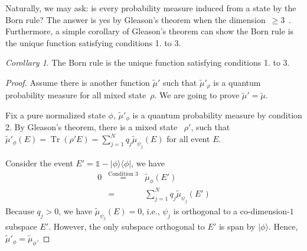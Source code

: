 \documentclass{article}
\theoremstyle{remark}
\newtheorem{cor}{Corollary}
\newcommand{\Hilb}{\mathcal{H}}
\newcommand{\ket}[1]{|#1\rangle}
\newcommand{\proj}[1]{|#1 \rangle\langle #1 |}
\newcommand{\Tr}{\mathop{\mathrm{Tr}}\nolimits}
\begin{document}
Naturally, we may ask: is every probability measure induced from a
state by the Born rule? The answer is yes by Gleason's theorem when
the dimension~$\ge3$~\cite{gleason1957,peres1995quantum,Redhead1987-REDINA}.
Furthermore, a simple corollary of Gleason's theorem can show the
Born rule is the unique function satisfying conditions 1. to 3.
\begin{cor}
The Born rule is the unique function satisfying conditions 1. to 3.
\end{cor}
\begin{proof}
Assume there is another function $\tilde{\mu}'$ such that $\tilde{\mu}'_{\rho}$
is a quantum probability measure for all mixed state~$\rho$. We
are going to prove $\tilde{\mu}'=\tilde{\mu}$.

Fix a pure normalized state $\phi$, $\tilde{\mu}'_{\phi}$ is a quantum
probability measure by condition 2. By Gleason's theorem, there is
a mixed state ~$\rho'$, such that $\tilde{\mu}'_{\phi}\left(E\right)=\Tr\left(\rho'E\right)=\sum_{j=1}^{N}q_{j}\tilde{\mu}_{\psi_{j}}\left(E\right)$
for all event $E$. 

Consider the event $E'=\mathbb{1}-\proj{\phi}$, we have 
\begin{eqnarray*}
0 & \overset{\textrm{Condition 3}}{=} & \tilde{\mu}_{\phi}\left(E'\right)\\
 & = & \sum_{j=1}^{N}q_{j}\tilde{\mu}_{\psi_{j}}\left(E'\right)
\end{eqnarray*}
Because $q_{j}>0$, we have $\tilde{\mu}_{\psi_{j}}\left(E\right)=0$,
i.e., $\psi_{j}$ is orthogonal to a co-dimension-$1$ subspace $E'$.
However, the only subspace orthogonal to $E'$ is span by $\ket{\phi}$.
Hence, $\tilde{\mu}'_{\phi}=\tilde{\mu}_{\phi}$.
\end{proof}




\end{document}
